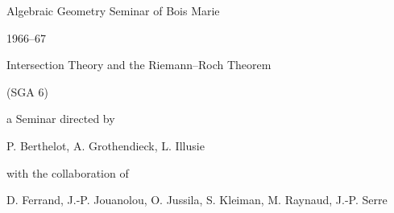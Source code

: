 \begin{center}
{\Large Algebraic Geometry Seminar of Bois Marie}\par
{\large 1966--67}\par
\vspace{1.5em}
{\Large Intersection Theory and the Riemann--Roch Theorem}\par
{\large (SGA 6)}\par
\vspace{1.5em}
a Seminar directed by\par
P. Berthelot, A. Grothendieck, L. Illusie\par
with the collaboration of\par
D. Ferrand, J.-P. Jouanolou, O. Jussila, S. Kleiman, M. Raynaud, J.-P. Serre
\end{center}

